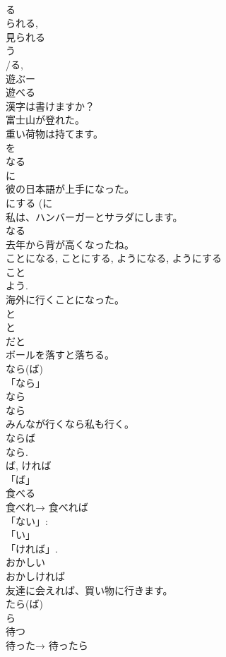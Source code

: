 \documentclass[8pt]{extreport}
\begin{document}
\begin{CJK}{UTF8}{min}
\\	る 
\\	られる, 
\\	見られる
\\	う　
\\	/る, 
\\	遊ぶー
\\	遊べる
\\	漢字は書けますか？
\\	富士山が登れた。
\\	重い荷物は持てます。 
\\	を 
\\	なる 
\\	に 
\\	彼の日本語が上手になった。 
\\	にする (に 
\\	私は、ハンバーガーとサラダにします。
\\	なる 
\\	去年から背が高くなったね。
\\	ことになる, ことにする, ようになる, ようにする	
\\	こと 
\\	よう. 
\\	海外に行くことになった。
\\	と 
\\	と
\\	だと
\\	ボールを落すと落ちる。
\\	なら(ば)	
\\	「なら」
\\	なら
\\	なら 
\\	みんなが行くなら私も行く。
\\	ならば 
\\	なら.	
\\	ば, ければ	
\\	「ば」
\\	食べる 
\\	食べれ→ 食べれば 
\\	「ない」: 
\\	「い」
\\	「ければ」.
\\	おかしい 
\\	おかしければ 
\\	友達に会えれば、買い物に行きます。
\\	たら(ば)	
\\	ら 
\\	待つ 
\\	待った→ 待ったら 

\end{CJK}
\end{document}

